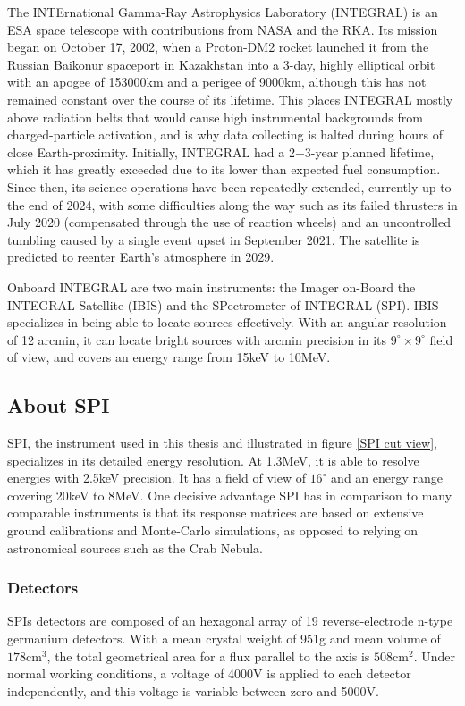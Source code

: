 \documentclass{report}
\begin{document}
The INTErnational Gamma-Ray Astrophysics Laboratory (INTEGRAL) is an ESA space telescope with contributions from NASA and the RKA. Its mission began on October 17, 2002, when a Proton-DM2 rocket launched it from the Russian Baikonur spaceport in Kazakhstan into a 3-day, highly elliptical orbit with an apogee of 153000km and a perigee of 9000km, although this has not remained constant over the course of its lifetime. This places INTEGRAL mostly above radiation belts that would cause high instrumental backgrounds from charged-particle activation, and is why data collecting is halted during hours of close Earth-proximity. Initially, INTEGRAL had a 2+3-year planned lifetime, which it has greatly exceeded due to its lower than expected fuel consumption. Since then, its science operations have been repeatedly extended, currently up to the end of 2024, with some difficulties along the way such as its failed thrusters in July 2020 (compensated through the use of reaction wheels) and an uncontrolled tumbling caused by a single event upset in September 2021. The satellite is predicted to reenter Earth's atmosphere in 2029.



Onboard INTEGRAL are two main instruments: the Imager on-Board the INTEGRAL Satellite (IBIS) and the SPectrometer of INTEGRAL (SPI). IBIS specializes in being able to locate sources effectively. With an angular resolution of 12 arcmin, it can locate bright sources with arcmin precision in its $9^\circ \times 9^\circ$ field of view, and covers an energy range from 15keV to 10MeV. 

\subsection{About SPI}




SPI, the instrument used in this thesis and illustrated in figure \ref{SPI cut view}, specializes in its detailed energy resolution. At 1.3MeV, it is able to resolve energies with 2.5keV precision. It has a field of view of $16^\circ$ and an energy range covering 20keV to 8MeV. One decisive advantage SPI has in comparison to many comparable instruments is that its response matrices are based on extensive ground calibrations and Monte-Carlo simulations, as opposed to relying on astronomical sources such as the Crab Nebula.





\subsubsection*{Detectors}
SPIs detectors are composed of an hexagonal array of 19 reverse-electrode n-type germanium detectors. With a mean crystal weight of 951g and mean volume of $178\text{cm}^3$, the total geometrical area for a flux parallel to the axis is $508\text{cm}^2$. Under normal working conditions, a voltage of 4000V is applied to each detector independently, and this voltage is variable between zero and 5000V. 
\end{document}
